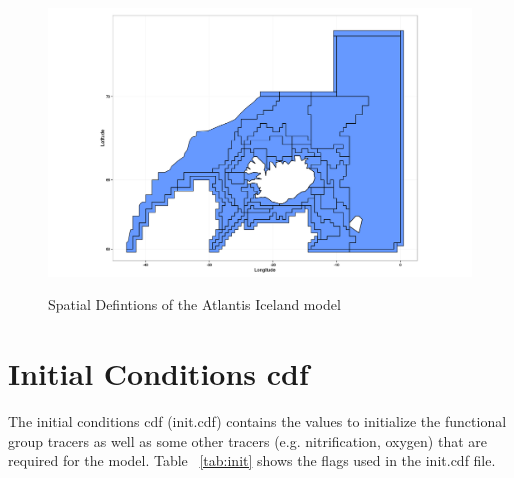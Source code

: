 \documentclass{report}
\begin{document}
\begin{center}
\begin{figure}
\caption{Spatial Defintions of the Atlantis Iceland model}
\includegraphics[scale=.3]{maps/atlantis_iceland_WGS84.png}
\label{ref:spdef}
\end{figure}
\end{center}

\section{Initial Conditions cdf}

The initial conditions cdf (init.cdf) contains the values to initialize the functional group tracers as well as some other tracers (e.g. nitrification, oxygen) that are required for the model. Table ~\ref{tab:init} shows the flags used in the init.cdf file.
\end{document}
